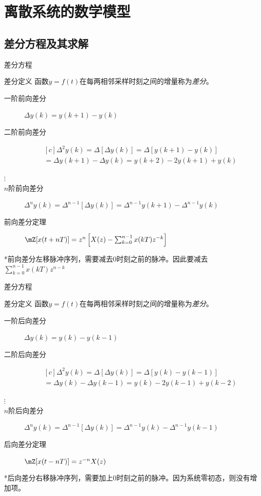 \documentclass[handout,cjkutf8,table,aspectratio=1610]{beamer} %
\begin{document}
\section{离散系统的数学模型}
\subsection{差分方程及其求解}
\begin{frame}{差分方程}
	\begin{block}{差分定义}
		函数$y=f(t)$在每两\alert{相邻采样时刻}之间的增量称为\emph{差分}。
	\end{block}
	\begin{description}
		\item[一阶前向差分] $\Delta y(k)=y(k+1)-y(k)$
		\item[二阶前向差分] 
		$$\begin{multlined}[c]
			\Delta^2y(k)=\Delta[\Delta y(k)]=\Delta[y(k+1)-y(k)]\\
			=\Delta y(k+1)-\Delta y(k)=y(k+2)-2y(k+1)+y(k)
		\end{multlined}$$
		\item[$\vdots$]
		\item[$n$阶前向差分] $\Delta^n y(k)=\Delta^{n-1}[\Delta y(k)]=\Delta^{n-1}y(k+1)-\Delta^{n-1}y(k)$
		\item[前向差分定理]$\mZ[x(t+nT)]=z^n\left[X(z)-\sum_{k=0}^{n-1}x(kT)z^{-k}\right]$
	\end{description}
	*前向差分左移脉冲序列，需要减去0时刻之前的脉冲。因此要减去$\sum_{k=0}^{n-1}x(kT)z^{n-k}$
\end{frame}

\begin{frame}{差分方程}
	\begin{block}{差分定义}
		函数$y=f(t)$在每两\alert{相邻采样时刻}之间的增量称为\emph{差分}。
	\end{block}
	\begin{description}
		\item[一阶后向差分] $\Delta y(k)=y(k)-y(k-1)$
		\item[二阶后向差分] 
		$$\begin{multlined}[c]
			\Delta^2y(k)=\Delta[\Delta y(k)]=\Delta[y(k)-y(k-1)]\\
			=\Delta y(k)-\Delta y(k-1)=y(k)-2y(k-1)+y(k-2)
		\end{multlined}$$
		\item[$\vdots$]
		\item[$n$阶后向差分] $\Delta^n y(k)=\Delta^{n-1}[\Delta y(k)]=\Delta^{n-1}y(k)-\Delta^{n-1}y(k-1)$
		\item[后向差分定理]$\mZ[x(t-nT)]=z^{-n}X(z)$
	\end{description}
	*后向差分右移脉冲序列，需要加上0时刻之前的脉冲。因为系统零初态，则没有增加项。
\end{frame}
\end{document}
